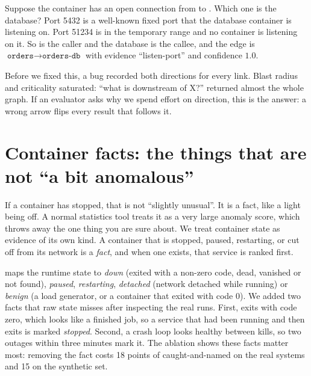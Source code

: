 \begin{examplebox}
Suppose the  container has an open connection from  to . Which one is the database? Port 5432 is a well-known fixed port that the database container is listening on. Port 51234 is in the temporary range and no container is listening on it. So  is the caller and the database is the callee, and the edge is $\texttt{orders}\to\texttt{orders-db}$ with evidence ``listen-port'' and confidence $1.0$.
\end{examplebox}

\begin{warnbox}
Before we fixed this, a bug recorded both directions for every link. Blast radius and criticality saturated: ``what is downstream of X?'' returned almost the whole graph. If an evaluator asks why we spend effort on direction, this is the answer: a wrong arrow flips every result that follows it.
\end{warnbox}

\section{Container facts: the things that are not ``a bit anomalous''}
\begin{simplebox}
If a container has stopped, that is not ``slightly unusual''. It is a fact, like a light being off. A normal statistics tool treats it as a very large anomaly score, which throws away the one thing you are sure about. We treat container state as evidence of its own kind. A container that is stopped, paused, restarting, or cut off from its network is a \emph{fact}, and when one exists, that service is ranked first.
\end{simplebox}

\begin{techbox}
 maps the runtime state to \emph{down} (exited with a non-zero code, dead, vanished or not found), \emph{paused}, \emph{restarting}, \emph{detached} (network detached while running) or \emph{benign} (a load generator, or a container that exited with code 0). We added two facts that raw state misses after inspecting the real runs. First,  exits with code zero, which looks like a finished job, so a service that had been running and then exits is marked \emph{stopped}. Second, a crash loop looks healthy between kills, so two outages within three minutes mark it. The ablation shows these facts matter most: removing the  fact costs 18 points of caught-and-named on the real systems and 15 on the synthetic set.
\end{techbox}

